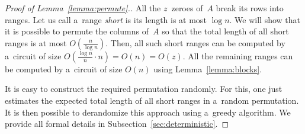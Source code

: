\documentclass[a4paper,UKenglish,cleveref, autoref]{lipics-v2019}
\begin{document}
\begin{proof}[Proof of Lemma~\ref{lemma:permute}.]
All the $z$~zeroes of~$A$ break its rows into ranges.
Let us call a~range {\em short} is its length is at most $\log n$.
We will show that it is possible to permute the columns of~$A$
so that the total length of all short ranges is at most $O(\frac{n}{\log n})$. Then, all such short ranges can be computed by a~circuit of size $O(\frac{\log n}{n} \cdot n)=O(n)=O(z)$.
All the remaining ranges can be computed by a~circuit of size $O(n)$ using Lemma~\ref{lemma:blocks}.

It is easy to construct the required permutation randomly. For this, one just 
estimates the expected total length of all short ranges in a~random permutation. It is then possible to derandomize this approach using a~greedy algorithm. We provide all formal details in Subsection~\ref{sec:deterministic}.

%
%


\end{proof}
\end{document}
